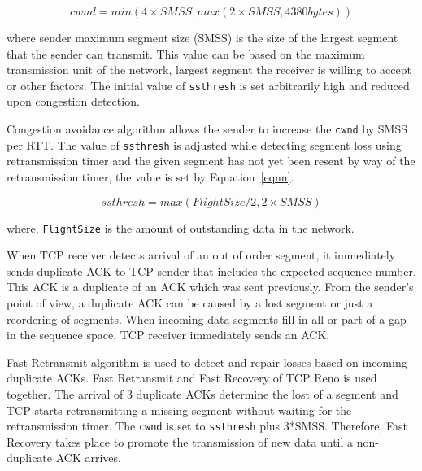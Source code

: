 \documentclass[conference,a4paper]{../../sty/IEEEtran}
\begin{document}
\begin{equation}
   cwnd = min (4\times SMSS, max (2 \times SMSS, 4380 bytes))
  \label{eqn1}
\end{equation}

where sender maximum segment size (SMSS) is the size of the largest segment that the sender can transmit. This value can be based on the maximum transmission unit of the network, largest segment the receiver is willing to accept or other factors. The initial value of \texttt{ssthresh} is set arbitrarily high and reduced upon congestion detection. 



Congestion avoidance algorithm allows the sender to increase the \texttt{cwnd} by SMSS per RTT. The value of \texttt{ssthresh} is adjusted while detecting segment loss using retransmission timer and the given segment has not yet been resent by way of the retransmission timer, the value is set by Equation~\ref{eqnn}.

\begin{equation}
  ssthresh = max (FlightSize  / 2, 2 \times SMSS)
  \label{eqnn}
\end{equation}

where, \texttt{FlightSize} is the amount of outstanding data in the network. 


When TCP receiver detects arrival of an out of order segment, it immediately sends duplicate ACK to TCP sender that includes the expected sequence number. This ACK is a duplicate of an ACK which was sent previously. From the sender's point of view, a duplicate ACK can be caused by a lost segment or just a reordering of segments. When incoming data segments fill in all or part of a gap in the sequence space, TCP receiver immediately sends an ACK.


Fast Retransmit algorithm is used to detect and repair losses based on incoming duplicate ACKs. Fast Retransmit and Fast Recovery of TCP Reno is used together. The arrival of 3 duplicate ACKs determine the lost of a segment and TCP starts retransmitting a missing segment without waiting for the retransmission timer. The \texttt{cwnd} is set to \texttt{ssthresh} plus 3*SMSS. Therefore, Fast Recovery takes place to promote the transmission of new data until a non-duplicate ACK arrives. 
\end{document}
